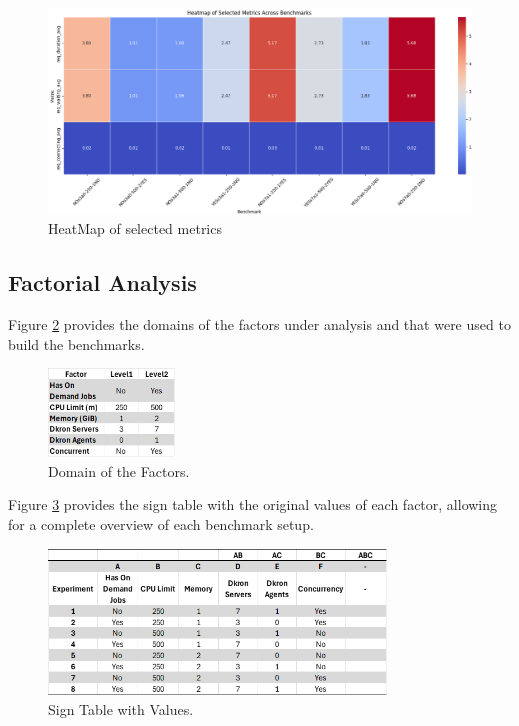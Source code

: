 \documentclass[runningheads]{llncs}
\begin{document}
\begin{figure}[H]
    \centering
    \includegraphics[width=1\textwidth]{media/heatmap_avgConnect_avgWait_avgDuration.png} \caption{HeatMap of selected metrics}
    \label{fig:fddd}
\end{figure}

\subsection{Factorial Analysis}
Figure \ref{fig:factorsdomain} provides the domains of the factors under analysis and that were used to build the benchmarks.

\begin{figure}[H]
    \centering
    \includegraphics[width=0.3\textwidth]{media/FactorAnalysis_DomainFactors.png}
    \caption{Domain of the Factors.}
    \label{fig:factorsdomain}
\end{figure}

Figure \ref{fig:fulloriginalfactors} provides the sign table with the original values of each factor, allowing for a complete overview of each benchmark setup.

\begin{figure}[H]
    \centering
    \includegraphics[width=0.8\textwidth]{media/FullFactorTable_OriginalFactors.png}
    \caption{Sign Table with Values.}
    \label{fig:fulloriginalfactors}
\end{figure}
\end{document}

